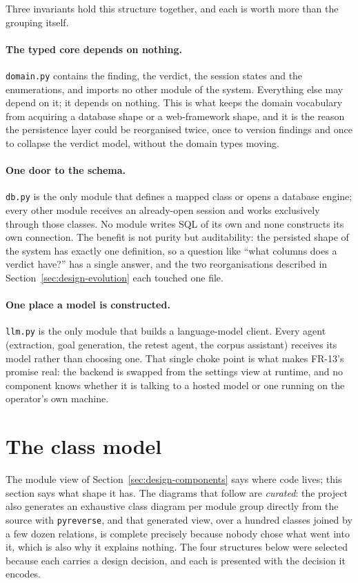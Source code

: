 Three invariants hold this structure together, and each is worth more than the
grouping itself.

\paragraph{The typed core depends on nothing.} \texttt{domain.py} contains the
finding, the verdict, the session states and the enumerations, and imports no
other module of the system. Everything else may depend on it; it depends on
nothing. This is what keeps the domain vocabulary from acquiring a database
shape or a web-framework shape, and it is the reason the persistence layer could
be reorganised twice, once to version findings and once to collapse the verdict
model, without the domain types moving.

\paragraph{One door to the schema.} \texttt{db.py} is the only module that
defines a mapped class or opens a database engine; every other module receives an
already-open session and works exclusively through those classes. No module
writes SQL of its own and none constructs its own connection. The benefit is not
purity but auditability: the persisted shape of the system has exactly one
definition, so a question like ``what columns does a verdict have?'' has a single
answer, and the two reorganisations described in
Section~\ref{sec:design-evolution} each touched one file.

\paragraph{One place a model is constructed.} \texttt{llm.py} is the only module
that builds a language-model client. Every agent (extraction, goal generation,
the retest agent, the corpus assistant) receives its model rather than
choosing one. That single choke point is what makes FR-13's promise real: the
backend is swapped from the settings view at runtime, and no component knows
whether it is talking to a hosted model or one running on the operator's own
machine.

\section{The class model}
\label{sec:design-classes}

The module view of Section~\ref{sec:design-components} says where code lives; this
section says what shape it has. The diagrams that follow are \emph{curated}: the
project also generates an exhaustive class diagram per module group directly from
the source with \texttt{pyreverse}, and that generated view, over a hundred
classes joined by a few dozen relations, is complete precisely because nobody
chose what went into it, which is also why it explains nothing. The four structures below were
selected because each carries a design decision, and each is presented with the
decision it encodes.

